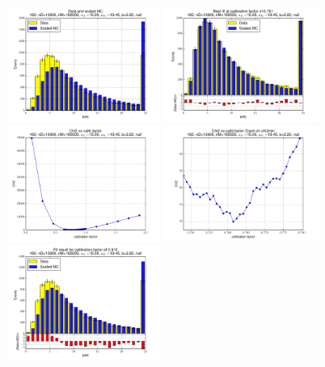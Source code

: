 
 \begin{figure}[htbp] \begin{center} 
\includegraphics[width=0.45\textwidth]{../FIGURES/160/FIG_Data_and_scaled_MC.pdf} 
\includegraphics[width=0.45\textwidth]{../FIGURES/160/FIG_Best_fit_at_calibration_factor_of_0_761.pdf} 
\includegraphics[width=0.45\textwidth]{../FIGURES/160/FIG_Chi2_vs_calib_factor.pdf} 
\includegraphics[width=0.45\textwidth]{../FIGURES/160/FIG_Chi2_vs_calib_factor_Zoom_on_chi2min.pdf} 
\includegraphics[width=0.45\textwidth]{../FIGURES/160/FIG_Fit_result_for_calibration_factor_of_0_910.pdf} 

\end{center}
\end{figure}
